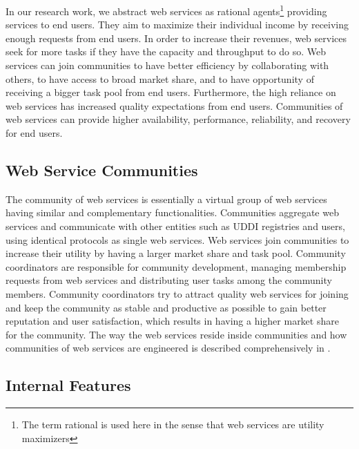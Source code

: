 \documentclass[10pt,journal,cspaper,compsoc]{IEEEtran}
\begin{document}
In our research work, we abstract web services as rational agents\footnote{The term rational is used here in the sense that web services are utility maximizers} providing services to end users. They aim to maximize their individual income  by receiving enough requests from end users. In order to increase their revenues, web services seek for more tasks if they have the capacity and throughput to do so. Web services can join communities to have better efficiency by collaborating with others, to have access to broad market share, and to have opportunity of receiving a bigger task pool from end users. Furthermore, the high reliance on web services has increased quality expectations from end users. Communities of web services can provide higher availability, performance, reliability, and recovery for end users.

\subsection{Web Service Communities}\label{s:wsc}

The community of web services is essentially a virtual group of web services having similar and complementary functionalities. Communities aggregate web services and communicate with other entities such as UDDI registries and users, using identical protocols as single web services. Web services join communities to increase their utility by having a larger market share and task pool. Community coordinators are responsible for community development, managing membership requests from web services and distributing user tasks among the community members. Community coordinators try to attract quality web services for joining and keep the community as stable and productive as possible to gain better reputation and user satisfaction, which results in having a higher market share for the community. The way the web services reside inside communities and how communities of web services are engineered is described comprehensively in \cite{DBLP:journals/ijebr/MaamarSTBB09}.


\subsection{Internal Features}\label{s:if}
\end{document}
